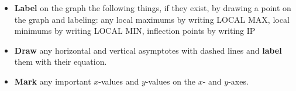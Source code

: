 \documentclass[12pt]{article}
\renewcommand{\emph}[1]{\textsf{\textbf{#1}}}
\begin{document}
\begin{enumerate}
\begin{itemize}
\item \emph{Label} on the graph the following things, if they exist, by drawing a point on the graph and labeling: any local maximums by writing  \textsf{LOCAL MAX}, local minimums by writing \textsf{LOCAL MIN}, inflection points by writing \textsf{IP} 
\item \emph{Draw} any horizontal and vertical asymptotes with dashed lines and \emph{label} them with their equation.
\item \emph{Mark} any important $x$-values and $y$-values on the $x$- and $y$-axes.
\end{itemize}
 \end{enumerate}
\end{document}
